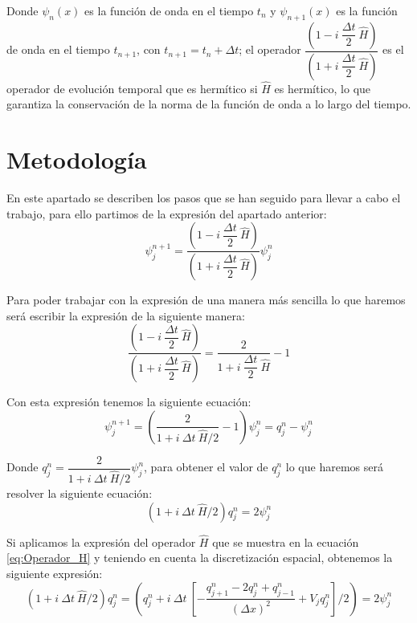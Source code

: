 \documentclass[10pt,onecolumn]{article}
\begin{document}
Donde $\psi_n(x)$ es la función de onda en el tiempo $t_n$ y $\psi_{n+1}(x)$ es la función de onda en el tiempo $t_{n+1}$, con $t_{n+1} = t_n + \Delta t$; el operador $\dfrac{(1 - i\ \dfrac{\Delta t}{2}\ \hat{H})}{(1 + i\ \dfrac{\Delta t}{2}\ \hat{H})}$ es el operador de evolución temporal que es hermítico si $\hat{H}$ es hermítico, lo que garantiza la conservación de la norma de la función de onda a lo largo del tiempo.


\section{Metodología}

En este apartado se describen los pasos que se han seguido para llevar a cabo el trabajo, para ello partimos de la expresión del apartado anterior:
\begin{equation}
    \psi^{n+1}_j =\dfrac{(1 - i\ \dfrac{\Delta t}{2}\ \hat{H})}{(1 + i\ \dfrac{\Delta t}{2}\ \hat{H})}\psi^n_j
\end{equation}

Para poder trabajar con la expresión de una manera más sencilla lo que haremos será escribir la expresión de la siguiente manera:
\begin{equation}
    \dfrac{(1 - i\ \dfrac{\Delta t}{2}\ \hat{H})}{(1 + i\ \dfrac{\Delta t}{2}\ \hat{H})} = \dfrac{2}{1+i\ \dfrac{\Delta t}{2}\ \hat{H}} -1
\end{equation}

Con esta expresión tenemos la siguiente ecuación:
\begin{equation}\label{eq:Relacion_q_psi}
    \psi^{n+1}_j = (\dfrac{2}{1+i\ \Delta t\ \hat{H}/2} - 1)\psi^n_j = q^n_j - \psi^n_j
\end{equation}

Donde $q^n_j = \dfrac{2}{1+i\ \Delta t\ \hat{H}/2}\psi^n_j$, para obtener el valor de $q^n_j$ lo que haremos será resolver la siguiente ecuación:
\begin{equation}
    (1+i\ \Delta t\ \hat{H}/2)q^n_j = 2\psi^n_j
\end{equation}

Si aplicamos la expresión del operador $\hat{H}$ que se muestra en la ecuación \ref{eq:Operador_H} y teniendo en cuenta la discretización espacial, obtenemos la siguiente expresión:
\begin{equation}
    (1+i\ \Delta t\ \hat{H}/2)q^n_j = (q_j^n+i\ \Delta t\ [-\dfrac{q_{j+1}^{n} - 2q_{j}^{n} + q_{j-1}^{n}}{(\Delta x)^2} + V_{j} q_{j}^{n}]/2) = 2\psi^n_j
\end{equation}
\end{document}

